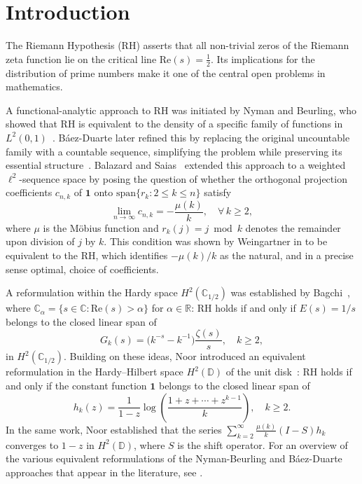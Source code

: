 \documentclass[11pt]{extarticle}
\numberwithin{equation}{section}
\theoremstyle{plain}
\theoremstyle{definition}
\begin{document}
\section{Introduction}

The Riemann Hypothesis (RH) asserts that all non-trivial zeros of the Riemann 
zeta function lie on the critical line $\mathrm{Re}(s) = \frac{1}{2}$. Its 
implications for the distribution of prime numbers make it one of the central 
open problems in mathematics.

A functional-analytic approach to RH was initiated by Nyman and Beurling, who 
showed that RH is equivalent to the density of a specific family of functions 
in $L^2(0,1)$~\cite{beurling,Nyman}. Báez-Duarte later refined this by 
replacing the original uncountable family with a countable sequence, simplifying 
the problem while preserving its essential structure~\cite{baez}. Balazard and
Saias~\cite{Balazard} extended this approach to a weighted $\ell^2$-sequence space by posing the question of whether the orthogonal projection coefficients $c_{n,k}$ of $\mathbf{1}$ onto $\mathrm{span}\{r_k : 
2 \leq k \leq n\}$ satisfy
\[
\lim_{n\to\infty} c_{n,k} = -\frac{\mu(k)}{k}, \quad \forall\, k \geq 2,
\]
where $\mu$ is the Möbius function and $r_k(j) = j \bmod k$ denotes the 
remainder upon division of $j$ by $k$. This condition was shown by Weingartner in \cite{Weingartner} 
to be equivalent to the RH, which identifies $-\mu(k)/k$ as the natural, and in a precise sense optimal, choice of coefficients.

A reformulation within the Hardy space $H^2(\mathbb{C}_{1/2})$ was established 
by Bagchi~\cite{bagchi}, where $\mathbb{C}_\alpha = \{s \in \mathbb{C} : \mathrm{Re}(s) > \alpha\}$ 
for $\alpha \in \mathbb{R}$: RH holds if and only if $E(s) = 1/s$ belongs to the 
closed linear span of
\[
G_k(s) = \bigl(k^{-s} - k^{-1}\bigr)\frac{\zeta(s)}{s}, \quad k \geq 2,
\]
in $H^2(\mathbb{C}_{1/2})$. Building on these ideas, Noor introduced an 
equivalent reformulation in the Hardy--Hilbert space $H^2(\mathbb{D})$ of the 
unit disk~\cite{waleed1}: RH holds if and only if the constant function 
$\mathbf{1}$ belongs to the closed linear span of
\[
h_k(z) = \frac{1}{1-z}\log\!\left(\frac{1+z+\cdots+z^{k-1}}{k}\right), \quad k \geq 2.
\]
In the same work, Noor established that the series $\sum_{k=2}^{\infty} 
\frac{\mu(k)}{k}(I-S)h_k$ converges to $1-z$ in $H^2(\mathbb{D})$, where 
$S$ is the shift operator. For an overview of the various equivalent reformulations of the Nyman-Beurling and Báez-Duarte approaches that appear in the literature, see \cite[p. 5-6]{noor-charles}.
\end{document}
